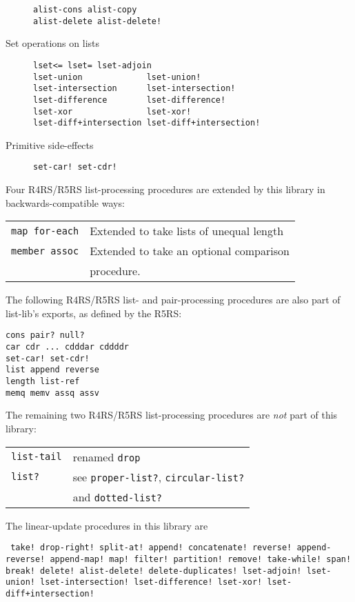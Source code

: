 \begin{description}
\begin{verbatim}
alist-cons alist-copy
alist-delete alist-delete!
\end{verbatim}
\item[ Set operations on lists ]
\begin{verbatim}
lset<= lset= lset-adjoin
lset-union             lset-union!
lset-intersection      lset-intersection!
lset-difference        lset-difference!
lset-xor               lset-xor!
lset-diff+intersection lset-diff+intersection!
\end{verbatim}
\item[ Primitive side-effects ]
\begin{verbatim}
set-car! set-cdr!
\end{verbatim}
\end{description}

Four R4RS/R5RS list-processing procedures are
extended by this library in backwards-compatible ways:

\begin{tabular}{ll}
\texttt{map for-each} & Extended to take lists of unequal length \\
\texttt{member assoc} & Extended to take an optional comparison \\
                      & procedure.
\end{tabular}

The following R4RS/R5RS list- and
pair-processing procedures are also part of list-lib's exports, as
defined by the R5RS:

\begin{verbatim}
cons pair? null?
car cdr ... cdddar cddddr 
set-car! set-cdr! 
list append reverse
length list-ref
memq memv assq assv
\end{verbatim}

The remaining two R4RS/R5RS list-processing
procedures are \emph{not} part of this library:

\begin{tabular}{ll}
\texttt{list-tail} & renamed \texttt{drop}\\
\texttt{list?} & see \texttt{proper-list?}, \texttt{circular-list?}\\
               & and \texttt{dotted-list?}
\end{tabular}

The linear-update procedures in this library are

\texttt{ take! drop-right! split-at! append! concatenate! reverse!
  append-reverse! append-map! map! filter! partition! remove!
  take-while! span! break! delete! alist-delete! delete-duplicates!
  lset-adjoin! lset-union! lset-intersection!  lset-difference!
  lset-xor! lset-diff+intersection!} 

